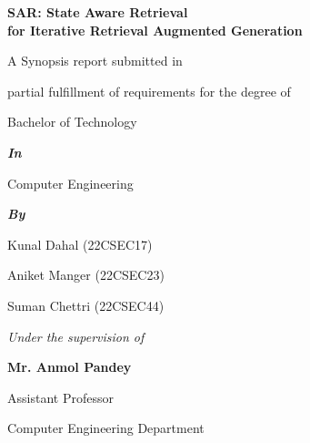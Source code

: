\documentclass[12pt,a4paper]{report}
\begin{document}

\begin{titlepage}
\thispagestyle{empty}
\begin{center}

\vspace*{0.58in}

{\fontsize{16}{19}\selectfont\bfseries
SAR: State Aware Retrieval\\for Iterative Retrieval Augmented Generation\par}

\vspace{0.18in}

{\fontsize{12}{18}\selectfont
A Synopsis report submitted in\par}
\vspace{0.12in}
{\fontsize{12}{18}\selectfont
partial fulfillment of requirements for the degree of\par}
\vspace{0.12in}
{\fontsize{12}{18}\selectfont
Bachelor of Technology\par}
\vspace{0.10in}
{\fontsize{12}{18}\selectfont\bfseries\itshape
In\par}
\vspace{0.08in}
{\fontsize{12}{18}\selectfont
Computer Engineering\par}
\vspace{0.10in}
{\fontsize{12}{18}\selectfont\bfseries\itshape
By\par}
\vspace{0.08in}
{\fontsize{12}{18}\selectfont
Kunal Dahal (22CSEC17)\par
Aniket Manger (22CSEC23)\par
Suman Chettri (22CSEC44)\par}

\vspace{0.10in}

{\fontsize{12}{18}\selectfont\itshape
Under the supervision of\par}
\vspace{0.06in}
{\fontsize{14}{17}\selectfont\bfseries
Mr. Anmol Pandey\par}
\vspace{0.04in}
{\fontsize{12}{18}\selectfont
Assistant Professor\par}
\vspace{0.04in}
{\fontsize{12}{18}\selectfont
Computer Engineering Department\par}
\vspace{0.12in}


\end{center}
\end{titlepage}
\end{document}

